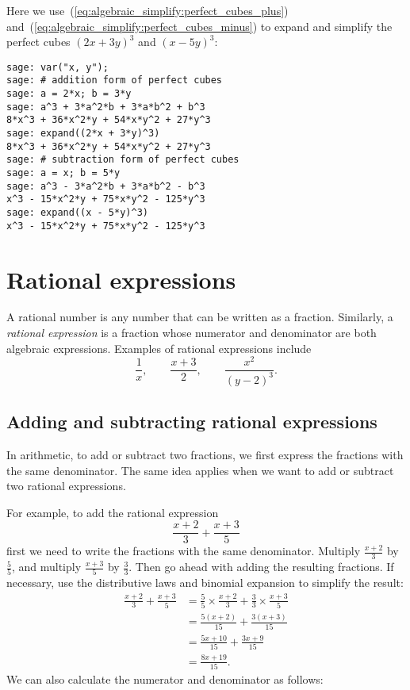 Here we use~(\ref{eq:algebraic_simplify:perfect_cubes_plus})
and~(\ref{eq:algebraic_simplify:perfect_cubes_minus}) to expand and
simplify the perfect cubes $(2x + 3y)^3$ and $(x - 5y)^3$:

\begin{lstlisting}
sage: var("x, y");
sage: # addition form of perfect cubes
sage: a = 2*x; b = 3*y
sage: a^3 + 3*a^2*b + 3*a*b^2 + b^3
8*x^3 + 36*x^2*y + 54*x*y^2 + 27*y^3
sage: expand((2*x + 3*y)^3)
8*x^3 + 36*x^2*y + 54*x*y^2 + 27*y^3
sage: # subtraction form of perfect cubes
sage: a = x; b = 5*y
sage: a^3 - 3*a^2*b + 3*a*b^2 - b^3
x^3 - 15*x^2*y + 75*x*y^2 - 125*y^3
sage: expand((x - 5*y)^3)
x^3 - 15*x^2*y + 75*x*y^2 - 125*y^3
\end{lstlisting}



\section{Rational expressions}

A rational number is any number that can be written as a
fraction. Similarly, a
\emph{rational expression} is a fraction whose
numerator and denominator are both algebraic expressions. Examples of
rational expressions include
\[
\frac{1}{x},
\qquad
\frac{x + 3}{2},
\qquad
\frac{x^2}{(y - 2)^3}.
\]



\subsection{Adding and subtracting rational expressions}

In arithmetic, to add or subtract two fractions, we first express the
fractions with the same denominator. The same idea applies when we
want to add or subtract two rational
expressions.

For example, to add the rational expression
\[
\frac{x + 2}{3} + \frac{x + 3}{5}
\]
first we need to write the fractions with the same
denominator. Multiply $\frac{x + 2}{3}$ by $\frac{5}{5}$, and multiply
$\frac{x + 3}{5}$ by $\frac{3}{3}$. Then go ahead with adding the
resulting fractions. If necessary, use the distributive laws and
binomial expansion to simplify the result:
%
\begin{align*}
\frac{x + 2}{3} + \frac{x + 3}{5}
&=
\frac{5}{5} \times \frac{x + 2}{3} + \frac{3}{3} \times \frac{x + 3}{5} \\[4pt]
&=
\frac{5(x + 2)}{15} + \frac{3(x + 3)}{15} \\[4pt]
&=
\frac{5x + 10}{15} + \frac{3x + 9}{15} \\[4pt]
&=
\frac{8x + 19}{15}.
\end{align*}
%
We can also calculate the numerator and denominator as follows:

